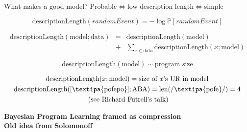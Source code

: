 \documentclass{beamer}
\begin{document}
\begin{frame}{What makes a good model?}
  Probable$\iff$low description length$\iff$simple

  \begin{equation*}
    \text{descriptionLength}(randomEvent) = -\log\mathbb{P} [randomEvent]
  \end{equation*}

    \pause
  
  \begin{eqnarray*}
    \text{descriptionLength}(\text{model}; \text{data}) &=& \text{descriptionLength}(\text{model})\\& +& \sum_{x\in \text{data}}\text{descriptionLength}(x ; \text{model})
  \end{eqnarray*}

  \pause

  \begin{equation*}
    \text{descriptionLength}(\text{model}) \sim \text{program size}
  \end{equation*}

  \pause


  \begin{gather*}
    \text{descriptionLength}(x ; \text{model})  = \text{size of \emph{x}'s UR in model} \\
    \text{descriptionLength}(\text{[\textipa{pofepo}]}; \text{ABA}) = \text{len(/\textipa{pofe}/)} = 4\\
        \text{ (see Richard Futrell's talk)}
  \end{gather*}

  \pause

  \textbf{Bayesian Program Learning framed as compression}\\
  \textbf{Old idea from Solomonoff}
  
\end{frame}
\end{document}
